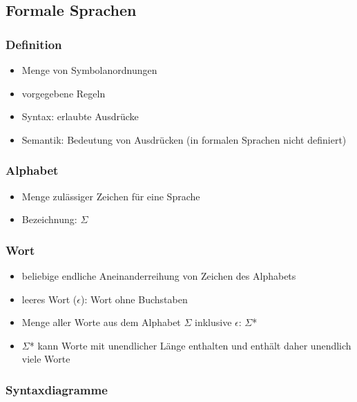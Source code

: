 \documentclass{article}
\begin{document}
	\subsection{Formale Sprachen}
	
	\subsubsection{Definition}
	
	\begin{itemize}
		\item Menge von Symbolanordnungen
		\item vorgegebene Regeln
		\item Syntax: erlaubte Ausdrücke
		\item Semantik: Bedeutung von Ausdrücken (in formalen Sprachen nicht definiert)
	\end{itemize}
	
	\subsubsection{Alphabet}
	
	\begin{itemize}
		\item Menge zulässiger Zeichen für eine Sprache
		\item Bezeichnung: $\Sigma$
	\end{itemize}
	
	\subsubsection{Wort}
	
	\begin{itemize}
		\item beliebige endliche Aneinanderreihung von Zeichen des Alphabets
		\item leeres Wort ($\epsilon$): Wort ohne Buchstaben
		\item Menge aller Worte aus dem Alphabet $\Sigma$ inklusive $\epsilon$: $\Sigma$*
		\item $\Sigma$* kann Worte mit unendlicher Länge enthalten und enthält daher unendlich viele Worte
	\end{itemize}
	
	\subsubsection{Syntaxdiagramme}
	
\end{document}
